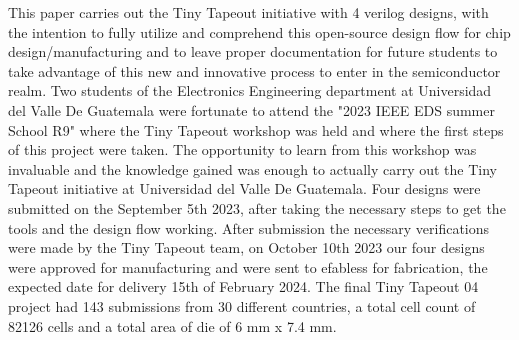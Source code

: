 This paper carries out the Tiny Tapeout initiative with 4 verilog designs,
with the intention to fully utilize and comprehend this open-source design 
flow for chip design/manufacturing and to leave proper documentation for future 
students to take advantage of this new and innovative process to enter in the 
semiconductor realm.
Two students of the Electronics Engineering department at Universidad del Valle De Guatemala were 
fortunate to attend the "2023 IEEE EDS summer School R9" where the Tiny Tapeout workshop was 
held and where the first steps of this project were taken. The opportunity to learn from this 
workshop was invaluable and the knowledge gained was enough to actually carry out the 
Tiny Tapeout initiative at Universidad del Valle De Guatemala. Four designs were submitted 
on the September 5th 2023, after taking the necessary steps to get the tools and the 
design flow working. After submission the necessary verifications were made by the 
Tiny Tapeout team, on October 10th 2023 our four designs were approved for manufacturing 
and were sent to efabless for fabrication, the expected date for delivery 15th of February 2024. 
The final Tiny Tapeout 04 project had 143 submissions from 30 different countries, a total cell 
count of 82126 cells and a total area of die of 6 mm x 7.4 mm.